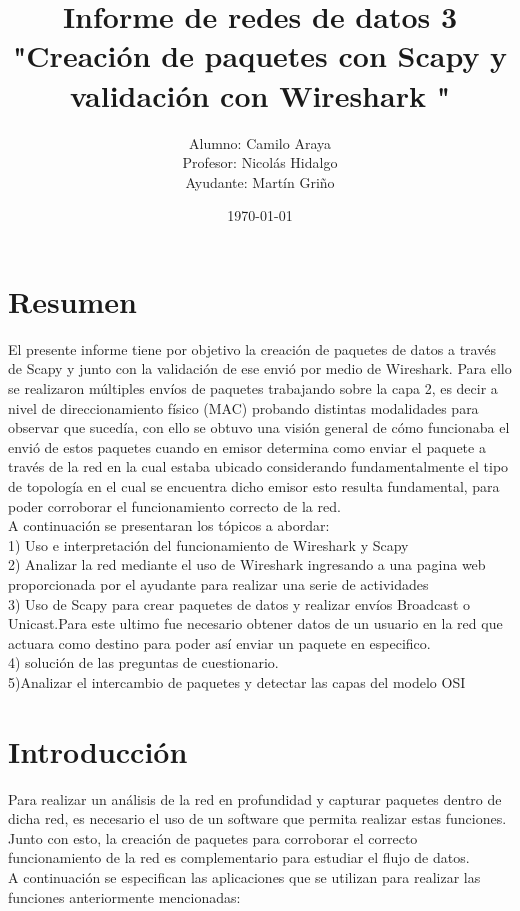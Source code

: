 \documentclass[spanish]{udpreport}
\title{Informe de redes de datos 3\\
"Creación de paquetes con Scapy y validación con Wireshark "\\}
\author{Alumno: Camilo Araya
\\Profesor: Nicolás Hidalgo\\Ayudante: Martín Griño}
\date{\today}
\begin{document}
\maketitle

\chapter*{Resumen} 

El presente informe tiene por objetivo la creación de paquetes de datos a través de Scapy y junto con la validación de ese envió por medio de Wireshark. Para ello se realizaron múltiples envíos de paquetes trabajando sobre la capa 2, es decir a nivel de direccionamiento físico (MAC) probando distintas modalidades para observar que sucedía, con ello se obtuvo una visión general de cómo funcionaba el envió de estos paquetes cuando en emisor determina como enviar el paquete a través de la red en la cual estaba ubicado considerando fundamentalmente el tipo de topología en el cual se encuentra dicho emisor esto resulta fundamental, para poder corroborar el funcionamiento correcto de la red.
\\[0.5cm]
A continuación se presentaran los tópicos a abordar:
\\[0.5cm]
1) Uso e interpretación del funcionamiento de Wireshark y Scapy
\\[0.2cm]
2) Analizar la red mediante el uso de Wireshark ingresando a una pagina web proporcionada por el ayudante para realizar una serie de actividades
\\[0.2cm]
3) Uso de Scapy para crear paquetes de datos y realizar envíos Broadcast o Unicast.Para este ultimo fue necesario obtener datos de un usuario en la red que actuara como destino para poder así enviar un paquete en especifico.
\\[0.2cm]
4) solución de las preguntas de cuestionario.
\\[0.2cm]
5)Analizar el intercambio de paquetes y detectar las capas del modelo OSI
\\[0.2cm]
\tableofcontents
\chapter{Introducción}
Para realizar un análisis de la red en profundidad y capturar paquetes dentro de dicha red, es necesario el uso de un software que permita realizar estas funciones. Junto con esto, la creación de paquetes para corroborar el correcto funcionamiento de la red es complementario para estudiar el flujo de datos.\\A continuación se especifican las aplicaciones que se utilizan para realizar las funciones anteriormente mencionadas:
\\
\end{document}

